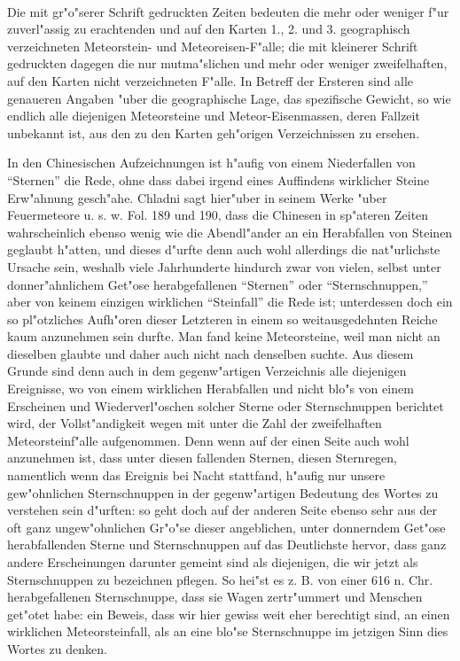 \documentclass[a4paper, 8pt, oneside, polutonikogreek, german]{article}
\begin{document}
\paragraph{}
Die mit gr"o"serer Schrift gedruckten Zeiten bedeuten die mehr oder weniger f"ur zuverl"assig zu erachtenden und auf den Karten 1., 2. und 3. geographisch verzeichneten Meteorstein- und Meteoreisen-F"alle; die mit kleinerer Schrift gedruckten dagegen die nur mutma"slichen und mehr oder weniger zweifelhaften, auf den Karten nicht verzeichneten F"alle. In Betreff der Ersteren sind alle genaueren Angaben "uber die geographische Lage, das spezifische Gewicht, so wie endlich alle diejenigen Meteorsteine und Meteor-Eisenmassen, deren Fallzeit unbekannt ist, aus den zu den Karten geh"origen Verzeichnissen zu ersehen.

In den Chinesischen Aufzeichnungen ist h"aufig von einem Niederfallen von "`Sternen"' die Rede, ohne dass dabei irgend eines Auffindens wirklicher Steine Erw"ahnung gesch"ahe. Chladni sagt hier"uber in seinem Werke "uber Feuermeteore u. s. w. Fol. 189 und 190, dass die Chinesen in sp"ateren Zeiten wahrscheinlich ebenso wenig wie die Abendl"ander an ein Herabfallen von Steinen geglaubt h"atten, und dieses d"urfte denn auch wohl allerdings die nat"urlichste Ursache sein, weshalb viele Jahrhunderte hindurch zwar von vielen, selbst unter donner"ahnlichem Get"ose herabgefallenen "`Sternen"' oder "`Sternschnuppen,"' aber von keinem einzigen wirklichen "`Steinfall"' die Rede ist; unterdessen doch ein so pl"otzliches Aufh"oren dieser Letzteren in einem so weitausgedehnten Reiche kaum anzunehmen sein durfte. Man fand keine Meteorsteine, weil man nicht an dieselben glaubte und daher auch nicht nach denselben suchte. Aus diesem Grunde sind denn auch in dem gegenw"artigen Verzeichnis alle diejenigen Ereignisse, wo von einem wirklichen Herabfallen und nicht blo"s von einem Erscheinen und Wiederverl"oschen solcher Sterne oder Sternschnuppen berichtet wird, der Vollst"andigkeit wegen mit unter die Zahl der zweifelhaften Meteorsteinf"alle aufgenommen. Denn wenn auf der einen Seite auch wohl anzunehmen ist, dass unter diesen fallenden Sternen, diesen Sternregen, namentlich wenn das Ereignis bei Nacht stattfand, h"aufig nur unsere gew"ohnlichen Sternschnuppen in der gegenw"artigen Bedeutung des Wortes zu verstehen sein d"urften: so geht doch auf der anderen Seite ebenso sehr aus der oft ganz ungew"ohnlichen Gr"o"se dieser angeblichen, unter donnerndem Get"ose herabfallenden Sterne und Sternschnuppen auf das Deutlichste hervor, dass ganz andere Erscheinungen darunter gemeint sind als diejenigen, die wir jetzt als Sternschnuppen zu bezeichnen pflegen. So hei"st es z. B. von einer 616 n. Chr. herabgefallenen Sternschnuppe, dass sie Wagen zertr"ummert und Menschen get"otet habe: ein Beweis, dass wir hier gewiss weit eher berechtigt sind, an einen wirklichen Meteorsteinfall, als an eine blo"se Sternschnuppe im jetzigen Sinn dies Wortes zu denken.
\end{document}
